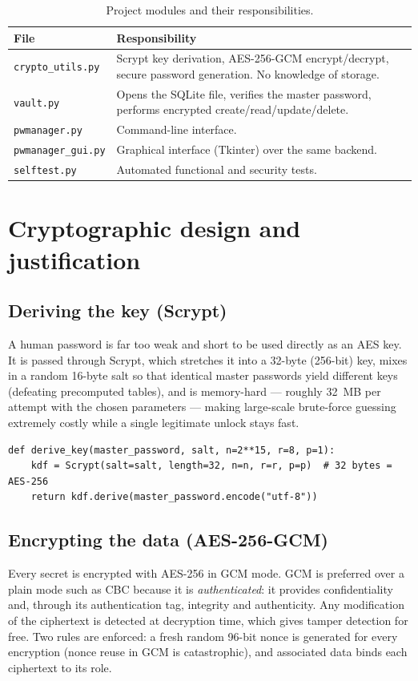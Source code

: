 \documentclass[11pt,a4paper]{article}
\begin{document}
\begin{table}[H]
\centering
\renewcommand{\arraystretch}{1.35}
\begin{tabularx}{\textwidth}{@{}p{3.6cm}X@{}}
\toprule
\textbf{File} & \textbf{Responsibility} \\
\midrule
\texttt{crypto\_utils.py} & Scrypt key derivation, AES-256-GCM encrypt/decrypt, secure password generation. No knowledge of storage. \\
\texttt{vault.py} & Opens the SQLite file, verifies the master password, performs encrypted create/read/update/delete. \\
\texttt{pwmanager.py} & Command-line interface. \\
\texttt{pwmanager\_gui.py} & Graphical interface (Tkinter) over the same backend. \\
\texttt{selftest.py} & Automated functional and security tests. \\
\bottomrule
\end{tabularx}
\caption{Project modules and their responsibilities.}
\end{table}

\section{Cryptographic design and justification}

\subsection{Deriving the key (Scrypt)}
A human password is far too weak and short to be used directly as an AES key. It
is passed through Scrypt, which stretches it into a 32-byte (256-bit) key, mixes
in a random 16-byte salt so that identical master passwords yield different keys
(defeating precomputed tables), and is memory-hard --- roughly 32~MB per
attempt with the chosen parameters --- making large-scale brute-force guessing
extremely costly while a single legitimate unlock stays fast.

\begin{lstlisting}[style=py,caption={Key derivation with Scrypt.}]
def derive_key(master_password, salt, n=2**15, r=8, p=1):
    kdf = Scrypt(salt=salt, length=32, n=n, r=r, p=p)  # 32 bytes = AES-256
    return kdf.derive(master_password.encode("utf-8"))
\end{lstlisting}

\subsection{Encrypting the data (AES-256-GCM)}
Every secret is encrypted with AES-256 in GCM mode. GCM is preferred over a
plain mode such as CBC because it is \emph{authenticated}: it provides
confidentiality and, through its authentication tag, integrity and
authenticity. Any modification of the ciphertext is detected at decryption time,
which gives tamper detection for free. Two rules are enforced: a fresh random
96-bit nonce is generated for every encryption (nonce reuse in GCM is
catastrophic), and associated data binds each ciphertext to its role.
\end{document}
